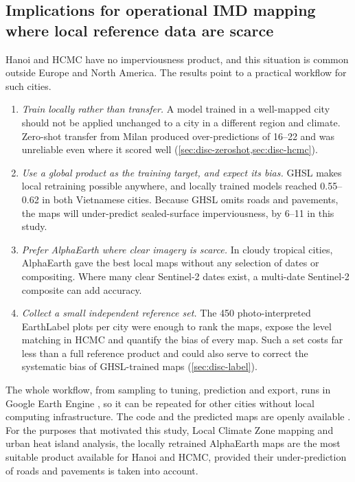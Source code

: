 \subsection{Implications for operational IMD mapping where local reference
data are scarce}
\label{sec:disc-operational}

Hanoi and HCMC have no imperviousness product, and this situation is common
outside Europe and North America. The results point to a practical
workflow for such cities.

\begin{enumerate}
  \item \emph{Train locally rather than transfer.} A model trained in a
  well-mapped city should not be applied unchanged to a city in a different
  region and climate. Zero-shot transfer from Milan produced
  over-predictions of 16--22\pp{} and was unreliable even where it scored
  well (\cref{sec:disc-zeroshot,sec:disc-hcmc}).
  \item \emph{Use a global product as the training target, and expect its
  bias.} GHSL makes local retraining possible anywhere, and locally trained
  models reached \Rsq{} 0.55--0.62 in both Vietnamese cities. Because GHSL
  omits roads and pavements, the maps will under-predict sealed-surface
  imperviousness, by 6--11\pp{} in this study.
  \item \emph{Prefer AlphaEarth where clear imagery is scarce.} In cloudy
  tropical cities, AlphaEarth gave the best local maps without any
  selection of dates or compositing. Where many clear Sentinel-2 dates
  exist, a multi-date Sentinel-2 composite can add accuracy.
  \item \emph{Collect a small independent reference set.} The 450
  photo-interpreted EarthLabel plots per city were enough to rank the maps,
  expose the level matching in HCMC and quantify the bias of every map.
  Such a set costs far less than a full reference product and could also
  serve to correct the systematic bias of GHSL-trained maps
  (\cref{sec:disc-label}).
\end{enumerate}

The whole workflow, from sampling to tuning, prediction and export, runs in
Google Earth Engine \cite{gorelick2017gee}, so it can be repeated for other
cities without local computing infrastructure. The code and the predicted
maps are openly available \cite{brovelli2026zenodo}. For the purposes that
motivated this study, Local Climate Zone mapping and urban heat island
analysis, the locally retrained AlphaEarth maps are the most suitable
product available for Hanoi and HCMC, provided their under-prediction of
roads and pavements is taken into account.

